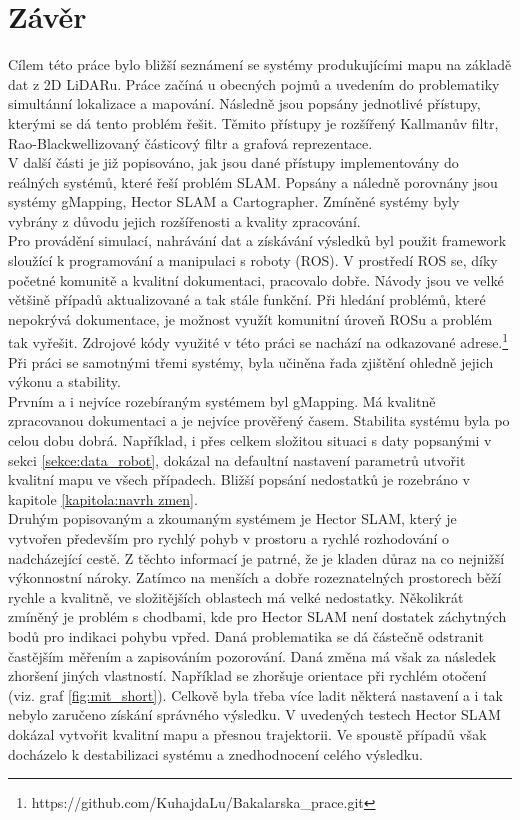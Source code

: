 \documentclass[12pt]{report}
\begin{document}
\chapter{Závěr}
Cílem této práce bylo bližší seznámení se systémy produkujícími mapu na základě dat z 2D LiDARu. Práce začíná u obecných pojmů a uvedením do problematiky simultánní lokalizace a mapování. Následně jsou popsány jednotlivé přístupy, kterými se dá tento problém řešit. Těmito přístupy je rozšířený Kallmanův filtr, Rao-Blackwellizovaný částicový filtr a grafová reprezentace.\\
\indent V další části je již popisováno, jak jsou dané přístupy implementovány do reálných systémů, které řeší problém SLAM. Popsány a náledně porovnány jsou systémy gMapping, Hector SLAM a Cartographer. Zmíněné systémy byly vybrány z důvodu jejich rozšířenosti a kvality zpracování.\\
\indent Pro provádění simulací, nahrávání dat a získávání výsledků byl použit framework sloužící k programování a manipulaci s roboty (ROS). V prostředí ROS se, díky početné komunitě a kvalitní dokumentaci, pracovalo dobře. Návody jsou ve velké většině případů aktualizované a tak stále funkční. Při hledání problémů, které nepokrývá dokumentace, je možnost využít komunitní úroveň ROSu a problém tak vyřešit. Zdrojové kódy využité v této práci se nachází na odkazované adrese.\footnote{https://github.com/KuhajdaLu/Bakalarska\_prace.git} Při práci se samotnými třemi systémy, byla učiněna řada zjištění ohledně jejich výkonu a stability. \\
\indent Prvním a i nejvíce rozebíraným systémem byl gMapping. Má kvalitně zpracovanou dokumentaci a je nejvíce prověřený časem. Stabilita systému byla po celou dobu dobrá. Například, i přes celkem složitou situaci s daty popsanými v sekci \ref{sekce:data_robot}, dokázal na defaultní nastavení parametrů utvořit kvalitní mapu ve všech případech. Bližší popsání nedostatků je rozebráno v kapitole \ref{kapitola:navrh zmen}.\\
\indent Druhým popisovaným a zkoumaným systémem je Hector SLAM, který je vytvořen především pro rychlý pohyb v prostoru a rychlé rozhodování o nadcházející cestě. Z těchto informací je patrné, že je kladen důraz na co nejnižší výkonnostní nároky. Zatímco na menších a dobře rozeznatelných prostorech běží rychle a kvalitně, ve složitějších oblastech má velké nedostatky. Několikrát zmíněný je problém s chodbami, kde pro Hector SLAM není dostatek záchytných bodů pro indikaci pohybu vpřed. Daná problematika se dá částečně odstranit častějším měřením a zapisováním pozorování. Daná změna má však za následek zhoršení jiných vlastností. Například se zhoršuje orientace při rychlém otočení (viz. graf \ref{fig:mit_short}). Celkově byla třeba více ladit některá nastavení a i tak nebylo zaručeno získání správného výsledku. V uvedených testech Hector SLAM dokázal vytvořit kvalitní mapu a přesnou trajektorii. Ve spoustě případů však docházelo k destabilizaci systému a znedhodnocení celého výsledku.\\
\end{document}

